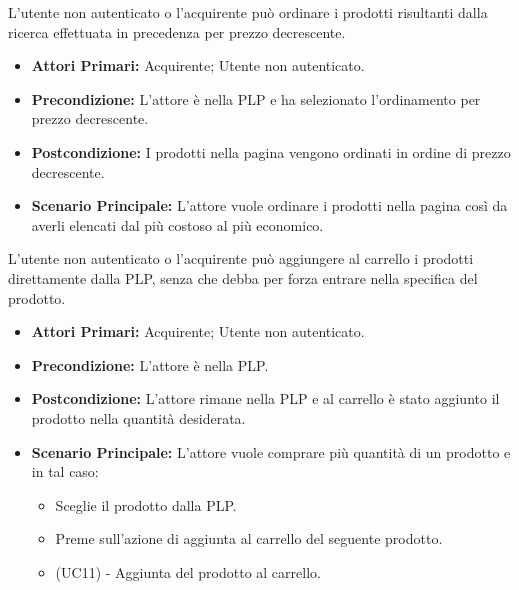 L'utente non autenticato o l'acquirente può ordinare i prodotti risultanti dalla ricerca effettuata in precedenza per prezzo decrescente.
\begin{itemize}
    \item \textbf{Attori Primari:} Acquirente; Utente non autenticato.
    \item \textbf{Precondizione:} L'attore è nella PLP e ha selezionato l'ordinamento per prezzo decrescente.
    \item \textbf{Postcondizione:} I prodotti nella pagina vengono ordinati in ordine di prezzo decrescente.
    \item \textbf{Scenario Principale:} L'attore vuole ordinare i prodotti nella pagina così da averli elencati dal più costoso al più economico.
\end{itemize}

L'utente non autenticato o l'acquirente può aggiungere al carrello i prodotti direttamente dalla PLP, senza che debba per forza entrare nella  specifica del prodotto.
\begin{itemize}
    \item \textbf{Attori Primari:} Acquirente; Utente non autenticato.
    \item \textbf{Precondizione:} L'attore è nella PLP.
    \item \textbf{Postcondizione:} L'attore rimane nella PLP e al carrello è stato aggiunto il prodotto nella quantità desiderata.
    \item \textbf{Scenario Principale:} L'attore vuole comprare più quantità di un prodotto e in tal caso:
    \begin{itemize}
        \item Sceglie il prodotto dalla PLP.
        \item Preme sull'azione di aggiunta al carrello del seguente prodotto.
        \item (UC11) - Aggiunta del prodotto al carrello.
    \end{itemize}
\end{itemize}

